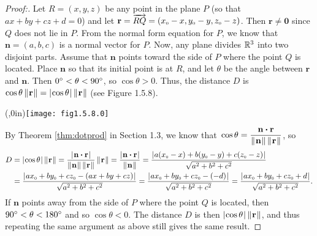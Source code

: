 \begin{proofbar}\begin{proof}[Proof:]
 \par\noindent Let $R = (x,y,z)$ be any point in the plane $P$ (so that $ax + by + cz + d = 0$)
 and let $\mathbf{r} = \overrightarrow{RQ} =
 (x_{\scriptscriptstyle 0} - x,y_{\scriptscriptstyle 0} - y,z_{\scriptscriptstyle 0} - z)$. 
 Then $\mathbf{r} \ne \mathbf{0}$ since $Q$ does not lie in $P$.
 From the normal form equation for $P$, we know that $\mathbf{n} = (a,b,c)$ is a normal vector for $P$. 
 Now, any plane
 divides $\mathbb{R}^{3}$ into two disjoint parts. Assume that $\mathbf{n}$ points toward the side of $P$ where the point
 $Q$ is located. 
 Place $\mathbf{n}$ so that its initial point is at $R$, and let $\theta$ be the angle between
 $\mathbf{r}$ and $\mathbf{n}$. 
 Then $0^\circ < \theta < 90^\circ$, so $\cos \theta > 0$. 
 Thus, the distance $D$ is
 $\cos \theta \,\lVert\mspace{1mu}\mathbf{r}\mspace{1mu}\rVert = \lvert\mspace{1mu}\cos \theta\mspace{1mu}\rvert\,\lVert\mspace{1mu}\mathbf{r}\mspace{1mu}\rVert$ (see Figure 1.5.8).

 \piccaption[]{}\parpic(\textwidth,0in){\texttt{[image: fig1.5.8.0]}
 \piccaptioninside}
 \par\mbox{}\newline\smallskip{}

 By Theorem \ref{thm:dotprod} in Section 1.3, we know that 
 $\,\cos \theta = \dfrac{\mathbf{n} \bm{\cdot} \mathbf{r}}{\lVert\mspace{1mu}\mathbf{n}\mspace{1mu}\rVert\,\lVert\mspace{1mu}\mathbf{r}\mspace{1mu}\rVert}$, so
 \begin{align*}
  D &= \lvert\mspace{1mu}\cos \theta\mspace{1mu}\rvert\,\lVert\mspace{1mu}\mathbf{r}\mspace{1mu}\rVert
     = \frac{\left|\mspace{1mu}\mathbf{n} \bm{\cdot} \mathbf{r}\mspace{1mu}\right|}{\lVert\mspace{1mu}\mathbf{n}\mspace{1mu}\rVert \,
     \lVert\mspace{1mu}\mathbf{r}\mspace{1mu}\rVert}\,\lVert\mspace{1mu}\mathbf{r}\mspace{1mu}\rVert
     = \frac{\left|\mspace{1mu}\mathbf{n} \bm{\cdot} \mathbf{r}\mspace{1mu}\right|}{\lVert\mspace{1mu}\mathbf{n}\mspace{1mu}\rVert}
     = \frac{\lvert\mspace{1mu}a(x_{\scriptscriptstyle 0} - x) + b(y_{\scriptscriptstyle 0} - y) + c(z_{\scriptscriptstyle 0} - z)\mspace{1mu}\rvert}{\sqrt{a^2 + b^2 + c^2}}\\
    &= \frac{\lvert\mspace{1mu}ax_{\scriptscriptstyle 0} + by_{\scriptscriptstyle 0} + cz_{\scriptscriptstyle 0} - (ax + by + cz)\mspace{1mu}\rvert}{\sqrt{a^2 + b^2 + c^2}}
    = \frac{\lvert\mspace{1mu}ax_{\scriptscriptstyle 0} + by_{\scriptscriptstyle 0} + cz_{\scriptscriptstyle 0} - (-d)\mspace{1mu}\rvert}{\sqrt{a^2 + b^2 + c^2}}
     = \frac{\lvert\mspace{1mu}ax_{\scriptscriptstyle 0} + by_{\scriptscriptstyle 0} + cz_{\scriptscriptstyle 0} + d\mspace{1mu}\rvert}{\sqrt{a^2 + b^2 + c^2}}.
 \end{align*}
 If $\mathbf{n}$ points away from the side of $P$ where the point $Q$ is located, then $90^\circ < \theta <
 180^\circ$ and so $\cos \theta < 0$. The distance $D$ is then $\lvert\mspace{1mu}\cos \theta\mspace{1mu}\rvert \, \lVert\mspace{1mu}\mathbf{r}\mspace{1mu}\rVert$, and thus
 repeating the same argument as above still gives the same result. \hfill \qedhere
\end{proof}\end{proofbar}

